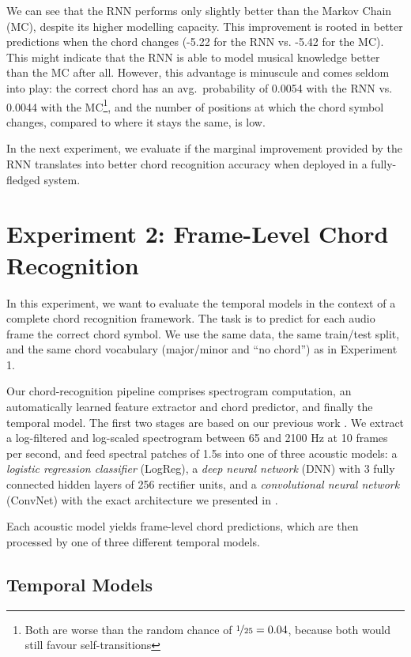 \documentclass[twocolumn]{article}
\begin{document}
We can see that the RNN performs only slightly better than the Markov Chain
(MC), despite its higher modelling capacity. This improvement is rooted in
better predictions when the chord changes (-5.22 for the RNN vs. -5.42 for the
MC).  This might indicate that the RNN is able to model musical knowledge
better than the MC after all. However, this advantage is minuscule and comes
seldom into play: the correct chord has an avg.\ probability of 0.0054 with the
RNN vs.  0.0044 with the MC\footnote{Both are worse than the random chance of
$\nicefrac{1}{25} = 0.04$, because both would still favour self-transitions},
and the number of positions at which the chord symbol changes, compared to
where it stays the same, is low.

In the next experiment, we evaluate if the marginal improvement provided
by the RNN translates into better chord recognition accuracy when deployed
in a fully-fledged system.

\section{Experiment 2: Frame-Level Chord Recognition}

In this experiment, we want to evaluate the temporal models in the context of a
complete chord recognition framework. The task is to predict for each audio
frame the correct chord symbol. We use the same data, the same train/test
split, and the same chord vocabulary (major/minor and ``no chord'') as
in Experiment 1.

Our chord-recognition pipeline comprises spectrogram computation, an
automatically learned feature extractor and chord predictor, and finally the
temporal model. The first two stages are based on our previous work
\cite{korzeniowski_fully_2016,korzeniowski_feature_2016}. We extract a
log-filtered and log-scaled spectrogram between 65 and 2100 Hz at 10 frames per
second, and feed spectral patches of 1.5s into one of three acoustic models: a
\emph{logistic regression classifier} (LogReg), a \emph{deep neural network}
(DNN) with 3 fully connected hidden layers of 256 rectifier units, and a
\emph{convolutional neural network} (ConvNet) with the exact architecture we
presented in \cite{korzeniowski_fully_2016}.

Each acoustic model yields frame-level chord predictions, which are then
processed by one of three different temporal models. 

\subsection{Temporal Models}
\end{document}
